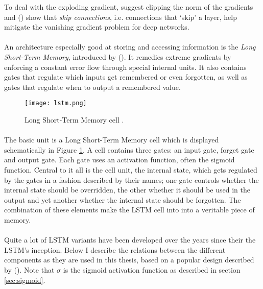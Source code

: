 To deal with the exploding gradient,
\parencite{Pascanu2012}
suggest clipping the norm of the gradients
and
\citeauthor{Graves2013} (\citeyear{Graves2013})
show that \textit{skip connections},
i.e. connections that `skip' a layer,
help mitigate the vanishing gradient problem
for deep networks.

\paragraph{}
An architecture especially good at storing and accessing information
is the \textit{Long Short-Term Memory},
introduced by \citeauthor{Hochreiter1997} (\citeyear{Hochreiter1997}).
It remedies extreme gradients
by enforcing a constant error flow through special internal units.
It also contains gates that regulate
which inputs get remembered or even forgotten,
as well as gates that regulate when to output a remembered value.

\begin{figure}[htpb]
  \centering
  \texttt{[image: lstm.png]}
  \caption{Long Short-Term Memory cell
  \parencite{Graves2013}.
  }
  \label{fig:lstm}
\end{figure}

\paragraph{}
The basic unit is a Long Short-Term Memory cell
which is displayed schematically in Figure \ref{fig:lstm}.
A cell contains three gates:
an input gate, forget gate and output gate.
Each gate uses an activation function,
often the sigmoid function.
Central to it all is the cell unit, the internal state,
which gets regulated by the gates
in a fashion described by their names;
one gate controls whether the internal state should be overridden,
the other whether it should be used in the output
and yet another whether the internal state should be forgotten.
The combination of these elements make the LSTM cell into
into a veritable piece of memory.

\paragraph{}
Quite a lot of LSTM variants have been developed over the years
since their the LSTM's inception.
Below I describe the relations between the different components
as they are used in this thesis,
based on a popular design described by
\citeauthor{Graves2013} (\citeyear{Graves2013}).
Note that $\sigma$ is the sigmoid activation function
as described in section \ref{sec:sigmoid}.

